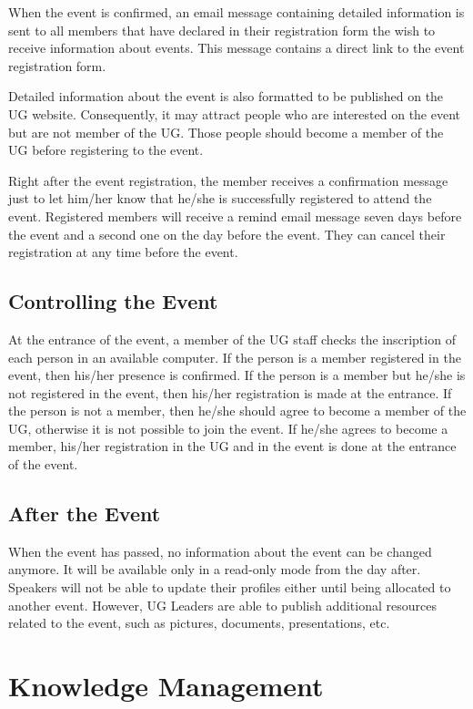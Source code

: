 \documentclass[envcountsame,envcountchap]{svmono}
\begin{document}
When the event is confirmed, an email message containing detailed information is sent to all members that have declared in their registration form the wish to receive information about events. This message contains a direct link to the event registration form.

Detailed information about the event is also formatted to be published on the UG website. Consequently, it may attract people who are interested on the event but are not member of the UG. Those people should become a member of the UG before registering to the event.

Right after the event registration, the member receives a confirmation message just to let him/her know that he/she is successfully registered to attend the event. Registered members will receive a remind email message seven days before the event and a second one on the day before the event. They can cancel their registration at any time before the event.

\section{Controlling the Event}

At the entrance of the event, a member of the UG staff checks the inscription of each person in an available computer. If the person is a member registered in the event, then his/her presence is confirmed. If the person is a member but he/she is not registered in the event, then his/her registration is made at the entrance. If the person is not a member, then he/she should agree to become a member of the UG, otherwise it is not possible to join the event. If he/she agrees to become a member, his/her registration in the UG and in the event is done at the entrance of the event.

\section{After the Event}

When the event has passed, no information about the event can be changed anymore. It will be available only in a read-only mode from the day after. Speakers will not be able to update their profiles either until being allocated to another event. However, UG Leaders are able to publish additional resources related to the event, such as pictures, documents, presentations, etc.

\chapter{Knowledge Management}
\end{document}
